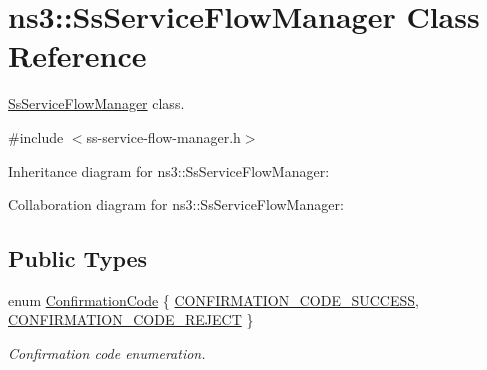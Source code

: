 \hypertarget{classns3_1_1SsServiceFlowManager}{}\section{ns3\+:\+:Ss\+Service\+Flow\+Manager Class Reference}
\label{classns3_1_1SsServiceFlowManager}


\hyperlink{classns3_1_1SsServiceFlowManager}{Ss\+Service\+Flow\+Manager} class.  




{\ttfamily \#include $<$ss-\/service-\/flow-\/manager.\+h$>$}



Inheritance diagram for ns3\+:\+:Ss\+Service\+Flow\+Manager\+:


Collaboration diagram for ns3\+:\+:Ss\+Service\+Flow\+Manager\+:
\subsection*{Public Types}
\begin{DoxyCompactItemize}
\item 
enum \hyperlink{classns3_1_1SsServiceFlowManager_a51489a5db64b7dba801ece04d3dffe2b}{Confirmation\+Code} \{ \hyperlink{classns3_1_1SsServiceFlowManager_a51489a5db64b7dba801ece04d3dffe2ba433a29f06ebcd1b65f93a70cfd41514c}{C\+O\+N\+F\+I\+R\+M\+A\+T\+I\+O\+N\+\_\+\+C\+O\+D\+E\+\_\+\+S\+U\+C\+C\+E\+SS}, 
\hyperlink{classns3_1_1SsServiceFlowManager_a51489a5db64b7dba801ece04d3dffe2badd1bbfd4aab022f0bd809aa1784f5102}{C\+O\+N\+F\+I\+R\+M\+A\+T\+I\+O\+N\+\_\+\+C\+O\+D\+E\+\_\+\+R\+E\+J\+E\+CT}
 \}\begin{DoxyCompactList}\small\item\em Confirmation code enumeration. \end{DoxyCompactList}
\end{DoxyCompactItemize}
